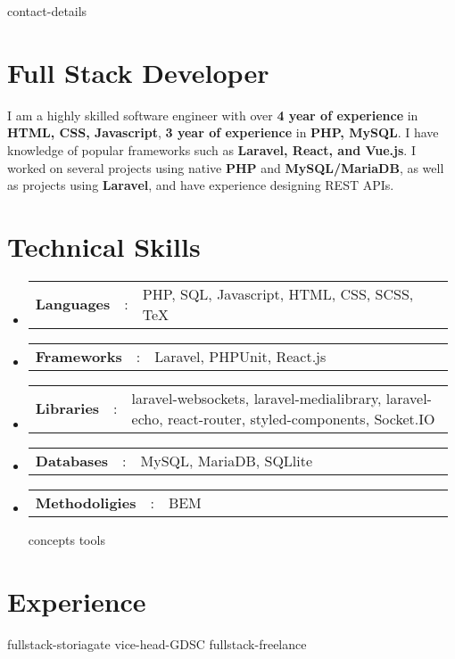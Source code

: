 \documentclass[a4paper,11pt]{article}
\newcommand{\resumeSectionType}[3]{
  \item\begin{tabular*}{0.96\textwidth}[t]{
    p{0.15\linewidth}p{0.02\linewidth}p{0.81\linewidth}
  }
    \textbf{#1} & #2 & #3
  \end{tabular*}\vspace{-2pt}
}
\newcommand{\resumeHeadingListStart}{
  \begin{itemize}[leftmargin=0.15in, label={}]
}
\newcommand{\resumeHeadingListEnd}{\end{itemize}}
\begin{document}

{contact-details}



\section{Full Stack Developer}
\small{
  I am a highly skilled software engineer with over \textbf{4 year of experience} in \textbf{HTML, CSS, Javascript}, \textbf{3 year of experience} in \textbf{PHP, MySQL}. I have knowledge of popular frameworks such as \textbf{Laravel, React, and Vue.js}. I worked on several projects using native \textbf{PHP} and \textbf{MySQL/MariaDB}, as well as projects using \textbf{Laravel}, and have experience designing REST APIs.
}



\section{Technical Skills}
  \resumeHeadingListStart{}
    \resumeSectionType{Languages}{:}{PHP, SQL, Javascript, HTML, CSS, SCSS, TeX}
    \resumeSectionType{Frameworks}{:}{Laravel, PHPUnit, React.js}
    \resumeSectionType{Libraries}{:}{laravel-websockets, laravel-medialibrary, laravel-echo, react-router, styled-components, Socket.IO}
    \resumeSectionType{Databases}{:}{MySQL, MariaDB, SQLlite}
    \resumeSectionType{Methodoligies}{:}{BEM}
    {concepts}
    {tools}
  \resumeHeadingListEnd{}



\section{Experience}
\resumeHeadingListStart{}
  {fullstack-storiagate}
  {vice-head-GDSC}
  {fullstack-freelance}
\resumeHeadingListEnd{}
\end{document}
